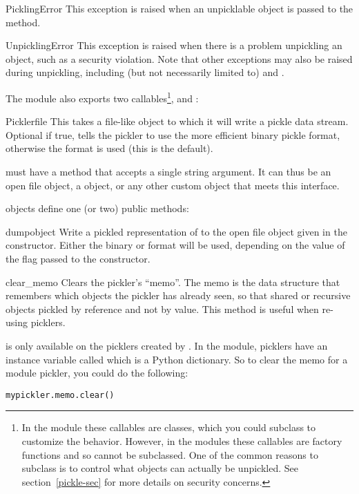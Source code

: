 \begin{excdesc}{PicklingError}
This exception is raised when an unpicklable object is passed to
the  method.
\end{excdesc}

\begin{excdesc}{UnpicklingError}
This exception is raised when there is a problem unpickling an object,
such as a security violation.  Note that other exceptions may also be
raised during unpickling, including (but not necessarily limited to)
 and .
\end{excdesc}

The  module also exports two callables\footnote{In the
 module these callables are classes, which you could
subclass to customize the behavior.  However, in the 
modules these callables are factory functions and so cannot be
subclassed.  One of the common reasons to subclass is to control what
objects can actually be unpickled.  See section~\ref{pickle-sec} for
more details on security concerns.},  and
:

\begin{classdesc}{Pickler}{file}
This takes a file-like object to which it will write a pickle data
stream.  Optional  if true, tells the pickler to use the more
efficient binary pickle format, otherwise the \ASCII{} format is used
(this is the default).

 must have a  method that accepts a single
string argument.  It can thus be an open file object, a
 object, or any other custom
object that meets this interface.
\end{classdesc}

 objects define one (or two) public methods:

\begin{methoddesc}[Pickler]{dump}{object}
Write a pickled representation of  to the open file object
given in the constructor.  Either the binary or \ASCII{} format will
be used, depending on the value of the  flag passed to the
constructor.
\end{methoddesc}

\begin{methoddesc}[Pickler]{clear_memo}{}
Clears the pickler's ``memo''.  The memo is the data structure that
remembers which objects the pickler has already seen, so that shared
or recursive objects pickled by reference and not by value.  This
method is useful when re-using picklers.

  is only available on the picklers
created by .  In the  module, picklers
have an instance variable called  which is a Python
dictionary.  So to clear the memo for a  module
pickler, you could do the following:

\begin{verbatim}
mypickler.memo.clear()
\end{verbatim}
\end{methoddesc}


